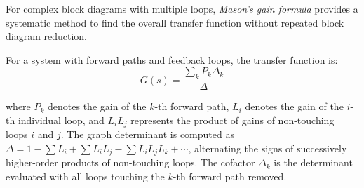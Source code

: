For complex block diagrams with multiple loops, \textit{Mason's gain formula} provides a systematic method to find the overall transfer function without repeated block diagram reduction.

For a system with forward paths and feedback loops, the transfer function is:
\begin{equation}
G(s) = \frac{\sum_k P_k \Delta_k}{\Delta}
\label{eq:mason}
\end{equation}

where $P_k$ denotes the gain of the $k$-th forward path, $L_i$ denotes the gain of the $i$-th individual loop, and $L_iL_j$ represents the product of gains of non-touching loops $i$ and $j$. The graph determinant is computed as $\Delta = 1 - \sum L_i + \sum L_iL_j - \sum L_iL_jL_k + \cdots$, alternating the signs of successively higher-order products of non-touching loops. The cofactor $\Delta_k$ is the determinant evaluated with all loops touching the $k$-th forward path removed.

